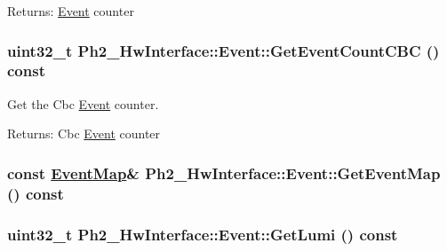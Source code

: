 \begin{Desc}
\item[Returns:]\hyperlink{class_ph2___hw_interface_1_1_event}{Event} counter \end{Desc}
\hypertarget{class_ph2___hw_interface_1_1_event_620592c831036eae724c37db45ca0765}{
\subsubsection[GetEventCountCBC]{\setlength{\rightskip}{0pt plus 5cm}uint32\_\-t Ph2\_\-Hw\-Interface::Event::Get\-Event\-Count\-CBC () const}}
\label{class_ph2___hw_interface_1_1_event_620592c831036eae724c37db45ca0765}


Get the Cbc \hyperlink{class_ph2___hw_interface_1_1_event}{Event} counter. 

\begin{Desc}
\item[Returns:]Cbc \hyperlink{class_ph2___hw_interface_1_1_event}{Event} counter \end{Desc}
\hypertarget{class_ph2___hw_interface_1_1_event_64814e9ba1b9cd7ed1e8dd5587275f49}{
\subsubsection[GetEventMap]{\setlength{\rightskip}{0pt plus 5cm}const \hyperlink{namespace_ph2___hw_interface_cf9f41d647e7a3ad9bae233b04b9e3bc}{Event\-Map}\& Ph2\_\-Hw\-Interface::Event::Get\-Event\-Map () const}}
\label{class_ph2___hw_interface_1_1_event_64814e9ba1b9cd7ed1e8dd5587275f49}


\hypertarget{class_ph2___hw_interface_1_1_event_e5af75e033d2eb6d76a039e859a9ce86}{
\subsubsection[GetLumi]{\setlength{\rightskip}{0pt plus 5cm}uint32\_\-t Ph2\_\-Hw\-Interface::Event::Get\-Lumi () const}}
\label{class_ph2___hw_interface_1_1_event_e5af75e033d2eb6d76a039e859a9ce86}


